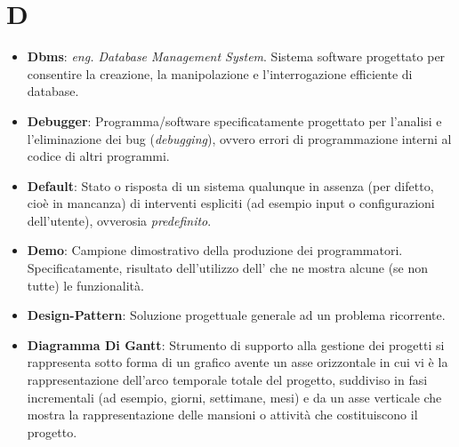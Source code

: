 \section{D}
\begin{itemize}
	\item
	\textbf{Dbms}: \textit{eng. Database Management System}. Sistema software progettato per consentire la creazione, la manipolazione e l'interrogazione efficiente di database.
	\item
	\textbf{Debugger}: Programma/software specificatamente progettato per l'analisi e l'eliminazione dei bug (\textit{debugging}), ovvero errori di programmazione interni al codice di altri programmi.
	\item
	\textbf{Default}: Stato o risposta di un sistema qualunque in assenza (per difetto, cioè in mancanza) di interventi espliciti (ad esempio input o configurazioni dell'utente), ovverosia \textit{predefinito}.
	\item
	\textbf{Demo}: Campione dimostrativo della produzione dei programmatori. Specificatamente, risultato dell'utilizzo dell' che ne mostra alcune (se non tutte) le funzionalità.
	\item
	\textbf{Design-Pattern}: Soluzione progettuale generale ad un problema ricorrente.
	\item
	\textbf{Diagramma Di Gantt}: Strumento di supporto alla gestione dei progetti si rappresenta sotto forma di un grafico avente un asse orizzontale in cui vi è la rappresentazione dell'arco temporale totale del progetto, suddiviso in fasi incrementali (ad esempio, giorni, settimane, mesi) e da un asse verticale che mostra la rappresentazione delle mansioni o attività che costituiscono il progetto.
\end{itemize}
\newpage